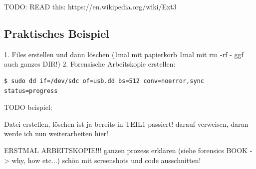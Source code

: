 TODO:
READ this: https://en.wikipedia.org/wiki/Ext3




\subsection{Praktisches Beispiel}

1. Files erstellen und dann löschen (1mal mit papierkorb 1mal mit rm -rf - ggf auch ganzes DIR!)
2. Forensische Arbeitskopie erstellen:

\begin{lstlisting}
$ sudo dd if=/dev/sdc of=usb.dd bs=512 conv=noerror,sync status=progress
\end{lstlisting}

TODO beispiel:

Datei erstellen, löschen ist ja bereits in TEIL1 passiert! darauf verweisen, daran werde ich nun weiterarbeiten hier!

ERSTMAL ARBEITSKOPIE!!! ganzen prozess erklären (siehe forensics BOOK -> why, how etc...)
schön mit screenshots und code ausschnitten!
